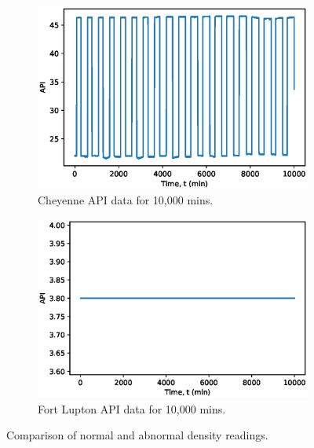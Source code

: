 \begin{figure}[h]
     \centering
     \begin{subfigure}[b]{0.48\textwidth}
         \centering
         \includegraphics[width=\textwidth]{images/08CheyDensity.eps}
         \caption{Cheyenne API data for 10,000 mins.}
         \label{fig:08GoodDensity}
     \end{subfigure}
     \hfill
     \begin{subfigure}[b]{0.48\textwidth}
         \centering
         \includegraphics[width=\textwidth]{images/08FLDensity.eps}
         \caption{Fort Lupton API data for 10,000 mins.}
         \label{fig:08BadDensity}
     \end{subfigure}
        \caption{Comparison of normal and abnormal density readings.}
        \label{fig:08Density}
\end{figure}

